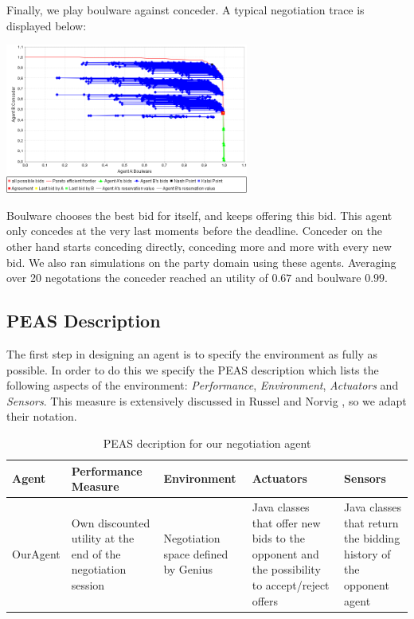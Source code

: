 \documentclass[a4paper,10pt]{article}
\begin{document}
Finally, we play boulware against conceder. A typical negotiation trace is displayed below:

\begin{center}
 \includegraphics[width=0.6\textwidth]{traceConcederBoulware.png}
\end{center}

Boulware chooses the best bid for itself, and keeps offering this bid. This agent
only concedes at the very last moments before the deadline. Conceder on the other hand
starts conceding directly, conceding more and more with every new bid. 
We also ran simulations on the party domain using these agents. 
Averaging over 20 negotations the conceder reached an utility of $0.67$ and
boulware $0.99$. 
 
\subsection{PEAS Description}

The first step in designing an agent is to specify the environment as fully as possible. In order to do this we specify the PEAS description which lists the following aspects of the environment: \emph{Performance}, \emph{Environment}, \emph{Actuators} and \emph{Sensors}. This measure is extensively discussed in Russel and Norvig \cite{russel-norvig}, so we adapt their notation.

\begin{table}[H]
    \begin{tabular}{|p{1.8cm}|p{3cm}|p{3cm}|p{3cm}|p{3cm}|}
    \hline
    \textbf{Agent} & \textbf{Performance \mbox{Measure}} & \textbf{Environment} & \textbf{Actuators} & \textbf{Sensors} \\
    \hline
    OurAgent & Own discounted utility at the end of the negotiation session & Negotiation space defined by Genius & Java classes that offer new bids to the opponent and the possibility to \mbox{accept/reject} offers & Java classes that return the bidding history of the \mbox{opponent} agent \\
    \hline
    \end{tabular}
    
    \caption{PEAS decription for our negotiation agent \label{table:peas-description}}
\end{table}
\end{document}
